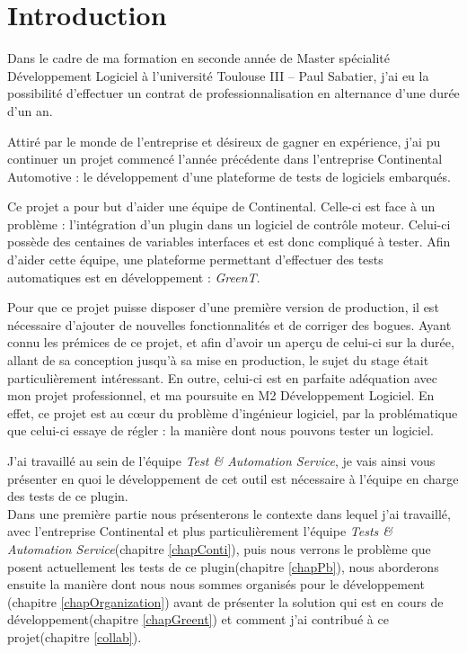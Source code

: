 \chapter*{Introduction}
Dans le cadre de ma formation en seconde année de Master spécialité Développement Logiciel à l'université Toulouse III – Paul Sabatier, j'ai eu la possibilité d'effectuer un contrat de professionnalisation en alternance d'une durée d'un an.

Attiré par le monde de l'entreprise et désireux de gagner en expérience, j'ai pu continuer un projet commencé l'année précédente dans l'entreprise Continental Automotive : le développement d'une plateforme de tests de logiciels embarqués.

Ce projet a pour but d'aider une équipe de Continental. Celle-ci est face à un problème : l'intégration d'un plugin dans un logiciel de contrôle moteur. Celui-ci possède des centaines de variables interfaces et est donc compliqué à tester. Afin d'aider cette équipe, une plateforme permettant d'effectuer des tests automatiques est en développement : \textit{GreenT}.

Pour que ce projet puisse disposer d'une première version de production, il est nécessaire d'ajouter de nouvelles fonctionnalités et de corriger des bogues. Ayant connu les prémices de ce projet, et afin d'avoir un aperçu de celui-ci sur la durée, allant de sa conception jusqu'à sa mise en production, le sujet du stage était particulièrement intéressant. En outre, celui-ci est en parfaite adéquation avec mon projet professionnel, et ma poursuite en M2 Développement Logiciel. En effet, ce projet est au cœur du problème d'ingénieur logiciel, par la problématique que celui-ci essaye de régler :  la manière dont nous pouvons tester un logiciel. 


J'ai travaillé au sein de l'équipe \textit{Test \& Automation Service}, je vais ainsi vous présenter en quoi le développement de cet outil est nécessaire à l'équipe en charge des tests de ce plugin.\\ Dans une première partie nous présenterons le contexte dans lequel j'ai travaillé, avec l'entreprise Continental et plus particulièrement l'équipe \textit{Tests \& Automation Service}(chapitre \ref{chapConti}), puis nous verrons le problème que posent actuellement les tests de ce plugin(chapitre \ref{chapPb}), nous aborderons ensuite la manière dont nous nous sommes organisés pour le développement (chapitre \ref{chapOrganization}) avant de présenter la solution qui est en cours de développement(chapitre \ref{chapGreent}) et comment j'ai contribué à ce projet(chapitre \ref{collab}). 
